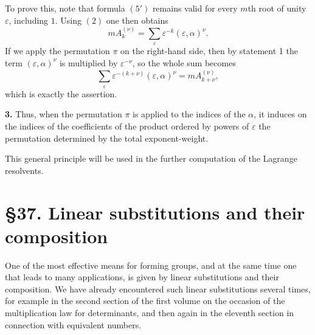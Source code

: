 \documentclass[11pt,a4paper]{book}
\begin{document}
\medskip
To prove this, note that formula \((5')\) remains valid for every $m$th root of unity $\varepsilon$, including $1$. Using \((2)\) one then obtains
\[
mA^{(\nu)}_k=\sum_{\varepsilon}\varepsilon^{-k}(\varepsilon,\alpha)^\nu.
\tag{6}
\]
If we apply the permutation $\pi$ on the right-hand side, then by statement 1 the term $(\varepsilon,\alpha)^\nu$ is multiplied by $\varepsilon^{-\nu}$, so the whole sum becomes
\[
\sum_{\varepsilon}\varepsilon^{-(k+\nu)}(\varepsilon,\alpha)^\nu
=
mA^{(\nu)}_{k+\nu},
\]
which is exactly the assertion.

\medskip
\noindent\textbf{3.}
Thus, when the permutation $\pi$ is applied to the indices of the $\alpha$, it induces on the indices of the coefficients of the product ordered by powers of $\varepsilon$ the permutation determined by the total exponent-weight.

\medskip
This general principle will be used in the further computation of the Lagrange resolvents.

\medskip
\section*{\S 37. Linear substitutions and their composition}

One of the most effective means for forming groups, and at the same time one that leads to many applications, is given by linear substitutions and their composition. We have already encountered such linear substitutions several times, for example in the second section of the first volume on the occasion of the multiplication law for determinants, and then again in the eleventh section in connection with equivalent numbers.
\end{document}
